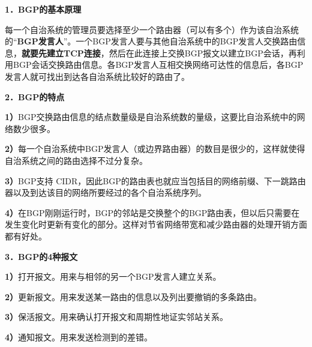 \textbf{\textbf{{1．}}{}{BGP的基本原理}}

每一个自治系统的管理员要选择至少一个路由器（可以有多个）作为该自治系统的``\textbf{BGP发言人}''。一个BGP发言人要与其他自治系统中的BGP发言人交换路由信息，\textbf{{就要先建立TCP连接}}，然后在此连接上交换BGP报文以建立BGP会话，再利用BGP会话交换路由信息。各BGP发言人互相交换网络可达性的信息后，各BGP发言人就可找出到达各自治系统比较好的路由了。

\textbf{{2．BGP的特点}}

\textbf{1）}BGP交换路由信息的结点数量级是自治系统数的量级，这要比自治系统中的网络数少很多。

\textbf{2）}每一个自治系统中BGP发言人（或边界路由器）的数目是很少的，这样就使得自治系统之间的路由选择不过分复杂。

\textbf{3）}BGP支持
CIDR，因此BGP的路由表也就应当包括目的网络前缀、下一跳路由器以及到达该目的网络所要经过的各个自治系统序列。

\textbf{4）}在BGP刚刚运行时，BGP的邻站是交换整个的BGP路由表，但以后只需要在发生变化时更新有变化的部分。这样对节省网络带宽和减少路由器的处理开销方面都有好处。

\textbf{{3．BGP的4种报文}}

\textbf{1）}打开报文。用来与相邻的另一个BGP发言人建立关系。

\textbf{2）}更新报文。用来发送某一路由的信息以及列出要撤销的多条路由。

\textbf{3）}保活报文。用来确认打开报文和周期性地证实邻站关系。

\textbf{4）}通知报文。用来发送检测到的差错。\\
